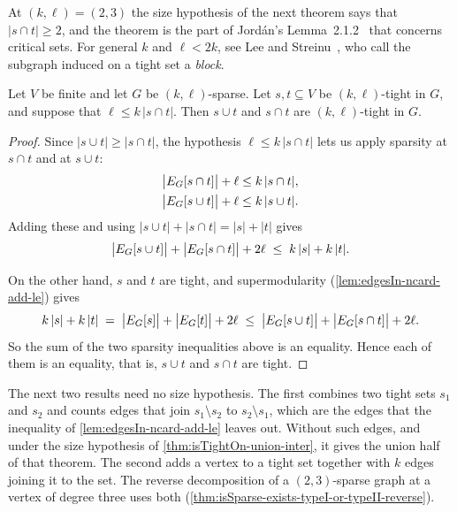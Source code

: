 At $(k,\ell) = (2,3)$ the size hypothesis of the next theorem says
that $|s \cap t| \ge 2$, and the theorem is the part of Jord\'an's
Lemma~2.1.2~\cite{jordan2016} that concerns critical sets. For general
$k$ and $\ell < 2k$, see Lee and
Streinu~\cite[Theorem~5(1)]{leeStreinu2008}, who call the subgraph
induced on a tight set a \emph{block}.

\begin{theorem}
  \label{thm:isTightOn-union-inter}
  \leanok
  Let $V$ be finite and let $G$ be $(k,\ell)$-sparse. Let
  $s, t \subseteq V$ be $(k,\ell)$-tight in $G$, and suppose that
  $\ell \le k\,|s \cap t|$. Then $s \cup t$ and $s \cap t$ are
  $(k,\ell)$-tight in $G$.
\end{theorem}
\begin{proof}
  \leanok
  Since $|s \cup t| \ge |s \cap t|$, the hypothesis
  $\ell \le k\,|s \cap t|$ lets us apply sparsity at $s \cap t$ and at
  $s \cup t$:
  \begin{align*}
    \bigl|E_{G}[s \cap t]\bigr| + \ell &\le k\,|s \cap t|, \\
    \bigl|E_{G}[s \cup t]\bigr| + \ell &\le k\,|s \cup t|.
  \end{align*}
  Adding these and using $|s \cup t| + |s \cap t| = |s| + |t|$ gives
  \[
    \bigl|E_{G}[s \cup t]\bigr|
      + \bigl|E_{G}[s \cap t]\bigr|
      + 2\ell
    \;\le\; k\,|s| + k\,|t|.
  \]

  On the other hand, $s$ and $t$ are tight, and supermodularity
  (\cref{lem:edgesIn-ncard-add-le}) gives
  \[
    k\,|s| + k\,|t|
    \;=\; \bigl|E_{G}[s]\bigr| + \bigl|E_{G}[t]\bigr| + 2\ell
    \;\le\;
    \bigl|E_{G}[s \cup t]\bigr|
      + \bigl|E_{G}[s \cap t]\bigr| + 2\ell.
  \]
  So the sum of the two sparsity inequalities above is an equality.
  Hence each of them is an equality, that is, $s \cup t$ and $s \cap t$
  are tight.
\end{proof}

The next two results need no size hypothesis. The first combines two
tight sets $s_1$ and $s_2$ and counts edges that join
$s_1 \setminus s_2$ to $s_2 \setminus s_1$, which are the edges that
the inequality of \cref{lem:edgesIn-ncard-add-le} leaves out. Without
such edges, and under the size hypothesis of
\cref{thm:isTightOn-union-inter}, it gives the union half of that
theorem. The second adds a vertex to a tight set together with $k$
edges joining it to the set. The reverse decomposition of a $(2,3)$-sparse graph at a
vertex of degree three uses both
(\cref{thm:isSparse-exists-typeI-or-typeII-reverse}).


